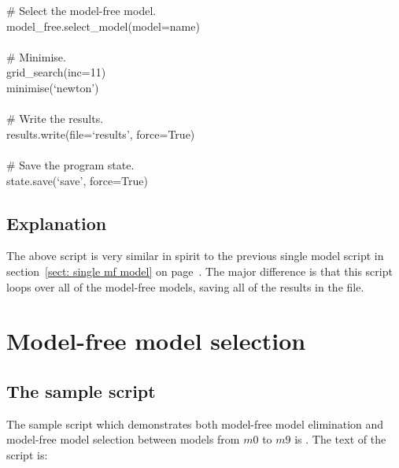 \begin{htmlonly}
\begin{htmlonly}
\begin{exampleenv}
\hspace*{4ex} \# Select the model-free model. \\
\hspace*{4ex} model\_free.select\_model(model=name) \\
 \\
\hspace*{4ex} \# Minimise. \\
\hspace*{4ex} grid\_search(inc=11) \\
\hspace*{4ex} minimise(`newton') \\
 \\
\hspace*{4ex} \# Write the results. \\
\hspace*{4ex} results.write(file=`results', force=True) \\
 \\
\# Save the program state. \\
state.save(`save', force=True)
\end{exampleenv}



\subsection{Explanation}

The above script is very similar in spirit to the previous single model script in section~\ref{sect: single mf model} on page~\pageref{sect: single mf model}.  The major difference is that this script loops over all of the model-free models, saving all of the results in the  file.




\section{Model-free model selection}



\subsection{The sample script}

The sample script which demonstrates both model-free model elimination and model-free model selection between models from $m0$ to $m9$ is .  The text of the script is:


\end{htmlonly}
\end{htmlonly}
